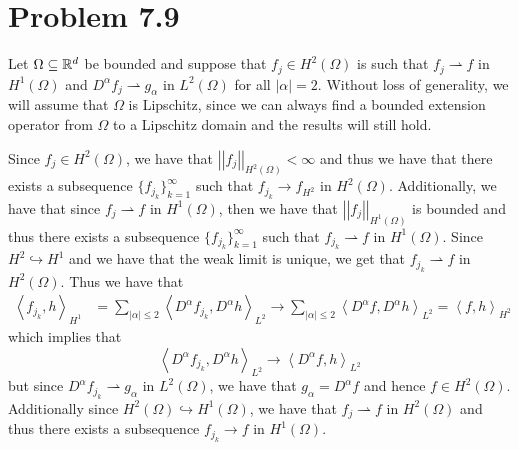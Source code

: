 \documentclass[12pt]{report}
\newcommand{\norm}[1]{\left|\left|#1\right|\right|}
\newcommand{\inner}[2]{\left\langle#1,#2\right\rangle}
\begin{document}
\maketitle

\section*{Problem 7.9}
Let $\Omega \subseteq \mathbb{R}^d$ be bounded and suppose that $f_j \in H^2(\Omega)$ is such that $f_j \rightharpoonup f$ in $H^1(\Omega)$ and $D^{\alpha} f_j \rightharpoonup g_{\alpha}$ in $L^2(\Omega)$ for all $|\alpha| = 2$. Without loss of generality, we will assume that $\Omega$ is Lipschitz, since we can always find a bounded extension operator from $\Omega$ to a Lipschitz domain and the results will still hold. 

Since $f_j \in H^2(\Omega)$, we have that $\norm{f_j}_{H^2(\Omega)} < \infty$ and 
thus we have that there exists a subsequence $\{f_{j_k}\}_{k=1}^\infty$ such that $f_{j_k} \to f_{H^2}$ in $H^2(\Omega)$. Additionally, we have that since $f_j \rightharpoonup f$ in $H^1(\Omega)$, then we have that $\norm{f_j}_{H^1(\Omega)}$ is bounded and thus there exists a subsequence $\{f_{j_k}\}_{k=1}^\infty$ such that $f_{j_k} \rightharpoonup f$ in $H^1(\Omega)$. Since $H^2 \hookrightarrow H^1$ and we have that the weak limit is unique, we get that $f_{j_k} \rightharpoonup f$ in $H^2(\Omega)$. Thus we have that 
\begin{align*}
  \inner{f_{j_k}}{h}_{H^1} &= \sum_{|\alpha| \leq 2} \inner{D^{\alpha} f_{j_k}}{D^{\alpha} h}_{L^2} \to \sum_{|\alpha| \leq 2} \inner{D^{\alpha}f}{D^{\alpha} h}_{L^2} = \inner{f}{h}_{H^2}
\end{align*}
which implies that
\begin{equation*}
  \inner{D^{\alpha}f_{j_k}}{D^{\alpha}h}_{L^2} \to \inner{D^{\alpha}f}{h}_{L^2}
\end{equation*}
but since $D^{\alpha}f_{j_k} \rightharpoonup g_{\alpha}$ in $L^2(\Omega)$, we have that $g_{\alpha} = D^{\alpha}f$ and hence $f \in H^2(\Omega)$. Additionally since $H^2(\Omega) \hookrightarrow H^1(\Omega)$, we have that $f_{j} \rightharpoonup f$ in $H^2(\Omega)$ and thus there exists a subsequence $f_{j_k} \to f$ in $H^1(\Omega)$.
\end{document}
